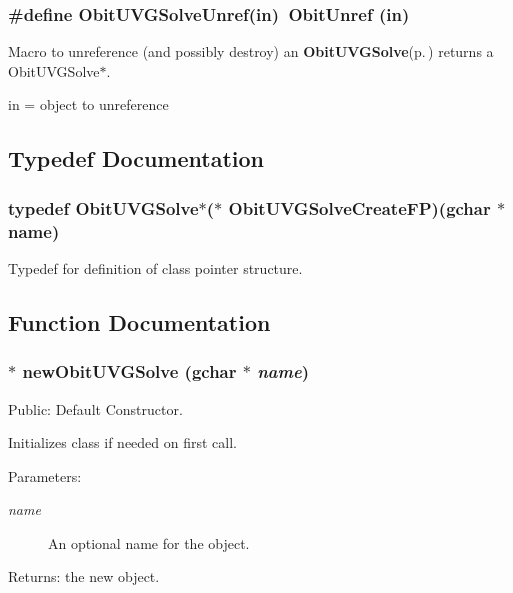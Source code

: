 \subsubsection{\setlength{\rightskip}{0pt plus 5cm}\#define Obit\-UVGSolve\-Unref(in)\ Obit\-Unref (in)}\label{ObitUVGSolve_8h_a0}


Macro to unreference (and possibly destroy) an {\bf Obit\-UVGSolve}{\rm (p.\,\pageref{structObitUVGSolve})} returns a Obit\-UVGSolve$\ast$. 

in = object to unreference 

\subsection{Typedef Documentation}
\subsubsection{\setlength{\rightskip}{0pt plus 5cm}typedef {\bf Obit\-UVGSolve}$\ast$($\ast$ {\bf Obit\-UVGSolve\-Create\-FP})(gchar $\ast$name)}\label{ObitUVGSolve_8h_a3}


Typedef for definition of class pointer structure. 



\subsection{Function Documentation}
\subsubsection{$\ast$ new\-Obit\-UVGSolve (gchar $\ast$ {\em name})}\label{ObitUVGSolve_8h_a5}


Public: Default Constructor. 

Initializes class if needed on first call. \begin{Desc}
\item[Parameters:]
\begin{description}
\item[{\em name}]An optional name for the object. \end{description}
\end{Desc}
\begin{Desc}
\item[Returns:]the new object. \end{Desc}
